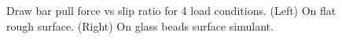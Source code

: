 \documentclass{article}
\begin{document}
\begin{figure}[hbt!]
    \centering
    \begin{minipage}{0.45\textwidth}
        \centering
    \end{minipage}
    \begin{minipage}{0.45\textwidth}
        \centering
    \end{minipage}
    \caption{Draw bar pull force vs slip ratio for 4 load conditions. (Left) On flat rough surface. (Right) On glass beads surface simulant.}
    \label{fig:drawbar-pull-vs-slip-ratio}
\end{figure}
\end{document}
